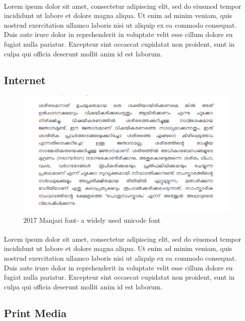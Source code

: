 \documentclass[10pt]{article}
\begin{document}
\paragraph{}

Lorem ipsum dolor sit amet, consectetur adipiscing elit, sed do eiusmod tempor incididunt ut labore et dolore magna aliqua. Ut enim ad minim veniam, quis nostrud exercitation ullamco laboris nisi ut aliquip ex ea commodo consequat. Duis aute irure dolor in reprehenderit in voluptate velit esse cillum dolore eu fugiat nulla pariatur. Excepteur sint occaecat cupidatat non proident, sunt in culpa qui officia deserunt mollit anim id est laborum.

\subsection{Internet}
\begin{figure}
 \centering
  \includegraphics[width=1.0\textwidth]{images/Manjari-Body-Text.png}
   \caption{2017 Manjari font- a widely used unicode font}
\end{figure}

\paragraph{}

Lorem ipsum dolor sit amet, consectetur adipiscing elit, sed do eiusmod tempor incididunt ut labore et dolore magna aliqua. Ut enim ad minim veniam, quis nostrud exercitation ullamco laboris nisi ut aliquip ex ea commodo consequat. Duis aute irure dolor in reprehenderit in voluptate velit esse cillum dolore eu fugiat nulla pariatur. Excepteur sint occaecat cupidatat non proident, sunt in culpa qui officia deserunt mollit anim id est laborum.
\subsection{Print Media}
\end{document}
